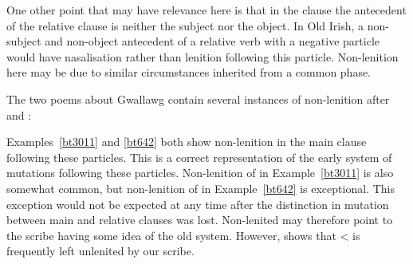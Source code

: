 One other point that may have relevance here is that in the clause  the antecedent of the relative clause is neither the subject nor the object. In Old Irish, a non-subject and non-object antecedent of a relative verb with a negative particle would have nasalisation rather than lenition following this particle. Non-lenition here may be due to similar circumstances inherited from a common phase. 

The two poems about Gwallawg contain several instances of non-lenition after  and : 
\begin{mwl}
\end{mwl}
Examples~\ref{bt3011} and \ref{bt642} both show non-lenition in the main clause following these particles. This is a correct representation of the early system of mutations following these particles. Non-lenition of  in Example~\ref{bt3011} is also somewhat common, but non-lenition of  in Example~\ref{bt642} is exceptional. This exception would not be expected at any time after the distinction in mutation between main and relative clauses was lost. Non-lenited  may therefore point to the scribe having some idea of the old system. However,   shows that  < \mw{\cw} is frequently left unlenited by our scribe.

